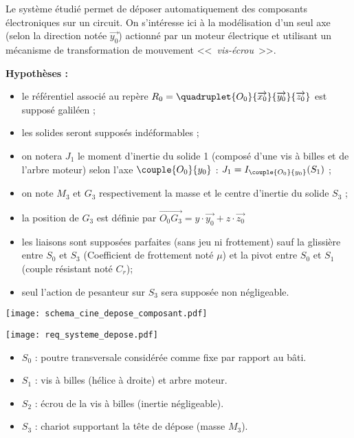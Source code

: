 \ifprof
\else
\begin{multicols}{2}
\fi
\ifprof\else

Le système étudié permet de déposer automatiquement des composants électroniques sur un circuit.
On s'intéresse ici à la modélisation d'un seul axe (selon la direction notée $\overrightarrow{y_0}$) actionné par un moteur électrique et utilisant un mécanisme de transformation de mouvement <<~\textit{vis-écrou}~>>.

\textbf{Hypothèses :}
\begin{itemize}
\item le référentiel associé au repère $R_0=\quadruplet{O_0}{\overrightarrow{x_0}}{\overrightarrow{y_0}}{\overrightarrow{z_0}}$ est supposé galiléen ;
\item les solides seront supposés indéformables ; 
\item on notera $J_1$ le moment d'inertie du solide 1 (composé d'une vis à billes et de l'arbre moteur) selon l'axe $\couple{O_0}{{y_0}}$ : $J_1=I_{\couple{O_0}{{y_0}}}(S_1)$ ;
\item on note $M_3$ et $G_3$ respectivement la masse et le centre d'inertie du solide $S_3$ ;
\item la position de $G_3$ est définie par $\overrightarrow{O_0G_3}=y\cdot \overrightarrow{y_0}+z\cdot \overrightarrow{z_0}$
\item les liaisons sont supposées parfaites (sans jeu ni frottement) sauf la glissière entre $S_0$ et $S_3$ (Coefficient de frottement noté $\mu$) et la pivot entre $S_0$ et $S_1$ (couple résistant noté $C_r$);
\item seul l'action de pesanteur sur $S_3$ sera supposée non négligeable.
\end{itemize}

\ifprof
\else
\begin{center}

\texttt{[image: schema\_cine\_depose\_composant.pdf]}

\texttt{[image: req\_systeme\_depose.pdf]}
\end{center}
\fi
\begin{itemize}
\item $S_0$ : poutre transversale considérée comme fixe par rapport au bâti.
\item $S_1$ : vis à billes (hélice à droite) et arbre moteur.
\item $S_2$ : écrou de la vis à billes (inertie négligeable).
\item $S_3$ : chariot supportant la tête de dépose (masse $M_3$).
\end{itemize}


\end{multicols}
